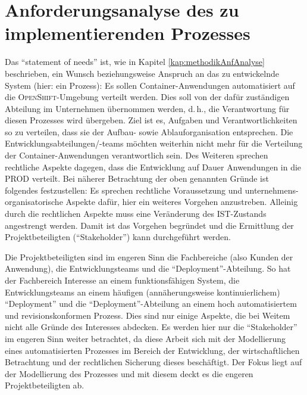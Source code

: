 \section{Anforderungsanalyse des zu implementierenden Prozesses}
Das \enquote{statement of needs} ist, wie in Kapitel \vref{kap:methodikAnfAnalyse} beschrieben, ein Wunsch beziehungsweise Anspruch an das zu entwickelnde System (hier: ein Prozess): Es sollen Container-Anwendungen automatisiert auf die \textsc{OpenShift}-Umgebung verteilt werden. Dies soll von der dafür zuständigen Abteilung im Unternehmen übernommen werden, d.\,h., die Verantwortung für diesen Prozesses wird übergeben. Ziel ist es, Aufgaben und Verantwortlichkeiten so zu verteilen, dass sie der Aufbau- sowie Ablauforganisation entsprechen. Die Entwicklungsabteilungen/-teams möchten weiterhin nicht mehr für die Verteilung der Container-Anwendungen verantwortlich sein. Des Weiteren sprechen rechtliche Aspekte dagegen, dass die Entwicklung auf Dauer Anwendungen in die \ac{PROD} verteilt. Bei näherer Betrachtung der oben genannten Gründe ist folgendes festzustellen: Es sprechen rechtliche Voraussetzung und unternehmens-organisatorische Aspekte dafür, hier ein weiteres Vorgehen anzustreben. Alleinig durch die rechtlichen Aspekte muss eine Veränderung des IST-Zustands angestrengt werden. Damit ist das Vorgehen begründet und die Ermittlung der Projektbeteiligten (\enquote{Stakeholder}) kann durchgeführt werden.
\par
Die Projektbeteiligten sind im engeren Sinn die Fachbereiche (also Kunden der Anwendung), die Entwicklungsteams und die \enquote{Deployment}-Abteilung. So hat der Fachbereich Interesse an einem funktionsfähigen System, die Entwicklungsteams an einem häufigen (annäherungsweise kontinuierlichem) \enquote{Deployment} und die \enquote{Deployment}-Abteilung an einem hoch automatisiertem und revisionskonformen Prozess. Dies sind nur einige Aspekte, die bei Weitem nicht alle Gründe des Interesses abdecken. Es werden hier nur die \enquote{Stakeholder} im engeren Sinn weiter betrachtet, da diese Arbeit sich mit der Modellierung eines automatisierten Prozesses im Bereich der Entwicklung, der wirtschaftlichen Betrachtung und der rechtlichen Sicherung dieses beschäftigt. Der Fokus liegt auf der Modellierung des Prozesses und mit diesem deckt es die engeren Projektbeteiligten ab. 
\par
